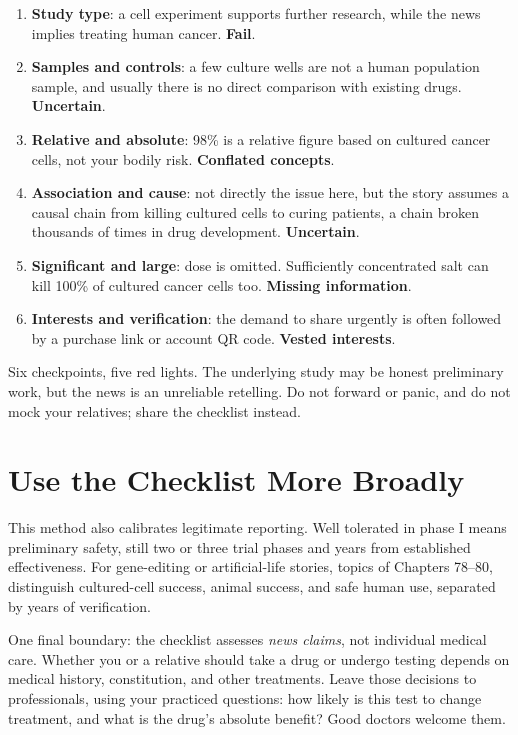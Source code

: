 \begin{enumerate}[itemsep=2pt]
\item \textbf{Study type}: a cell experiment supports further research, while the news implies treating human cancer. \textbf{Fail}.
\item \textbf{Samples and controls}: a few culture wells are not a human population sample, and usually there is no direct comparison with existing drugs. \textbf{Uncertain}.
\item \textbf{Relative and absolute}: 98\% is a relative figure based on cultured cancer cells, not your bodily risk. \textbf{Conflated concepts}.
\item \textbf{Association and cause}: not directly the issue here, but the story assumes a causal chain from killing cultured cells to curing patients, a chain broken thousands of times in drug development. \textbf{Uncertain}.
\item \textbf{Significant and large}: dose is omitted. Sufficiently concentrated salt can kill 100\% of cultured cancer cells too. \textbf{Missing information}.
\item \textbf{Interests and verification}: the demand to share urgently is often followed by a purchase link or account QR code. \textbf{Vested interests}.
\end{enumerate}

Six checkpoints, five red lights. The underlying study may be honest preliminary work, but the news is an unreliable retelling. Do not forward or panic, and do not mock your relatives; share the checklist instead.

\section{Use the Checklist More Broadly}

This method also calibrates legitimate reporting. Well tolerated in phase I means preliminary safety, still two or three trial phases and years from established effectiveness. For gene-editing or artificial-life stories, topics of Chapters 78--80, distinguish cultured-cell success, animal success, and safe human use, separated by years of verification.

One final boundary: the checklist assesses \emph{news claims}, not individual medical care. Whether you or a relative should take a drug or undergo testing depends on medical history, constitution, and other treatments. Leave those decisions to professionals, using your practiced questions: how likely is this test to change treatment, and what is the drug's absolute benefit? Good doctors welcome them.

